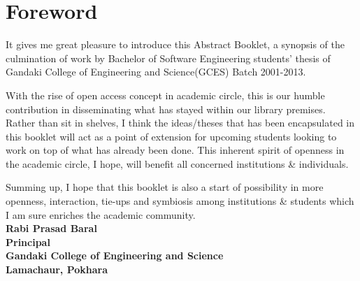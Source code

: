 \chapter[Foreword From The  Principal]{Foreword}

It gives me great pleasure to introduce this Abstract Booklet, a synopsis of the culmination of work by Bachelor of Software Engineering students' thesis of Gandaki College of Engineering and Science(GCES) Batch 2001-2013.

With the rise of open access concept in academic circle, this is our humble contribution in disseminating what has stayed within our library premises. Rather than sit in shelves, I think the ideas/theses that has been encapsulated in this booklet will act as a point of extension for upcoming students looking to work on top of what has already been done. This inherent spirit of openness in the academic circle, I hope, will benefit all concerned institutions \& individuals.

Summing up, I hope that this booklet is also a start of possibility in more openness, interaction, tie-ups and symbiosis among institutions \& students which I am sure enriches the academic community. 
\vspace{2cm}
\\
\textbf{Rabi Prasad Baral}
\\
\textbf{ Principal}
\\
\textbf{Gandaki College of Engineering and Science}
\\
\textbf{Lamachaur, Pokhara}

